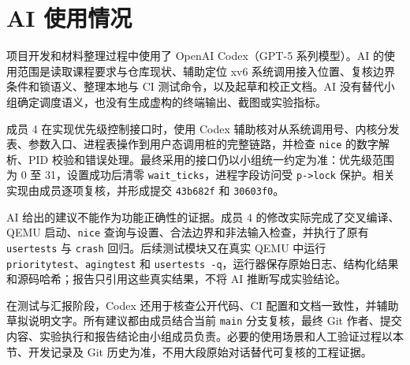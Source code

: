 \section{AI 使用情况}

项目开发和材料整理过程中使用了 OpenAI Codex（GPT-5 系列模型）。AI 的使用范围是读取课程要求与仓库现状、辅助定位 xv6 系统调用接入位置、复核边界条件和锁语义、整理本地与 CI 测试命令，以及起草和校正文档。AI 没有替代小组确定调度语义，也没有生成虚构的终端输出、截图或实验指标。

成员 4 在实现优先级控制接口时，使用 Codex 辅助核对从系统调用号、内核分发表、参数入口、进程表操作到用户态调用桩的完整链路，并检查 \texttt{nice} 的数字解析、PID 校验和错误处理。最终采用的接口仍以小组统一约定为准：优先级范围为 0 至 31，设置成功后清零 \texttt{wait\_ticks}，进程字段访问受 \texttt{p->lock} 保护。相关实现由成员逐项复核，并形成提交 \texttt{43b682f} 和 \texttt{30603f0}。

AI 给出的建议不能作为功能正确性的证据。成员 4 的修改实际完成了交叉编译、QEMU 启动、\texttt{nice} 查询与设置、合法边界和非法输入检查，并执行了原有 \texttt{usertests} 与 \texttt{crash} 回归。后续测试模块又在真实 QEMU 中运行 \texttt{prioritytest}、\texttt{agingtest} 和 \texttt{usertests -q}，运行器保存原始日志、结构化结果和源码哈希；报告只引用这些真实结果，不将 AI 推断写成实验结论。

在测试与汇报阶段，Codex 还用于核查公开代码、CI 配置和文档一致性，并辅助草拟说明文字。所有建议都由成员结合当前 \texttt{main} 分支复核，最终 Git 作者、提交内容、实验执行和报告结论由小组成员负责。必要的使用场景和人工验证过程以本节、开发记录及 Git 历史为准，不用大段原始对话替代可复核的工程证据。
